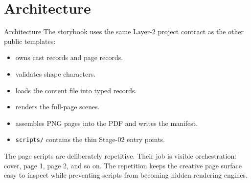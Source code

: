 \documentclass[
  ignorenonframetext,
]{beamer}
\author{\texorpdfstring{}{}}
\date{}
\providecommand{\tightlist}{%
  \setlength{\itemsep}{0pt}\setlength{\parskip}{0pt}}
\begin{document}
\section{Architecture}\label{architecture}

\begin{frame}{Architecture}
The storybook uses the same Layer-2 project contract as the other public
templates:

\begin{itemize}
\tightlist
\item
   owns cast records and page records.
\item
   validates shape characters.
\item
   loads the content file into typed
  records.
\item
   renders the full-page scenes.
\item
   assembles PNG pages into the PDF
  and writes the manifest.
\item
  \texttt{scripts/} contains the thin Stage-02 entry points.
\end{itemize}

The page scripts are deliberately repetitive. Their job is visible
orchestration: cover, page 1, page 2, and so on. The repetition keeps
the creative page surface easy to inspect while preventing scripts from
becoming hidden rendering engines.
\end{frame}
\end{document}
